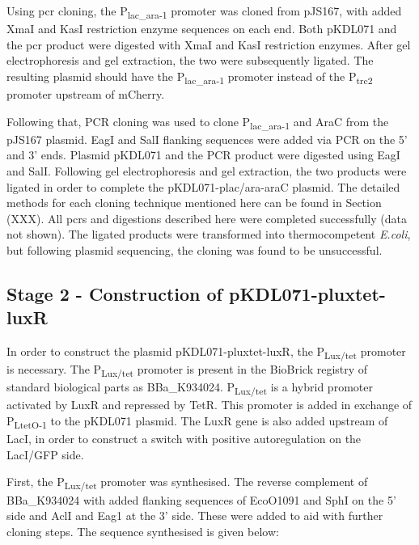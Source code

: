 Using \acrshort{pcr} cloning, the P\textsubscript{lac\_ara-1} promoter was cloned from pJS167, with added XmaI and KasI  restriction enzyme sequences on each end. Both pKDL071 and the \acrshort{pcr} product were digested with XmaI and KasI  restriction enzymes. After gel electrophoresis and gel extraction, the two were subsequently ligated. The resulting plasmid should have the P\textsubscript{lac\_ara-1} promoter instead of the P\textsubscript{trc2} promoter upstream of mCherry.


Following that, PCR cloning was used to clone  P\textsubscript{lac\_ara-1} and AraC from the pJS167 plasmid. EagI and SalI flanking sequences were added via PCR on the 5' and 3' ends. Plasmid pKDL071 and the PCR product were digested using EagI and SalI. Following gel electrophoresis and gel extraction, the two products were ligated in order to complete the pKDL071-plac/ara-araC plasmid. The detailed methods for each cloning technique mentioned here can be found in Section (XXX). All \acrshort{pcr}s and digestions described here were completed successfully (data not shown). The ligated products were transformed into thermocompetent \textit{E.coli}, but following plasmid sequencing, the cloning was found to be unsuccessful. 

\subsection{Stage 2 - Construction of pKDL071-pluxtet-luxR}



In order to construct the plasmid pKDL071-pluxtet-luxR, the P\textsubscript{Lux/tet} promoter is necessary. The P\textsubscript{Lux/tet} promoter is present in the BioBrick registry of standard biological parts as BBa\_K934024. P\textsubscript{Lux/tet} is a hybrid promoter activated by LuxR and repressed by TetR. This promoter is added in exchange of P\textsubscript{LtetO-1} to the pKDL071 plasmid. The LuxR gene is also added upstream of LacI, in order to construct a switch with positive autoregulation on the LacI/GFP side. 

First, the P\textsubscript{Lux/tet} promoter was synthesised. The reverse complement of BBa\_K934024 with added flanking sequences of EcoO1091 and SphI on the 5' side and AclI and Eag1 at the 3' side. These were added to aid with further cloning steps. The sequence synthesised is given below:

